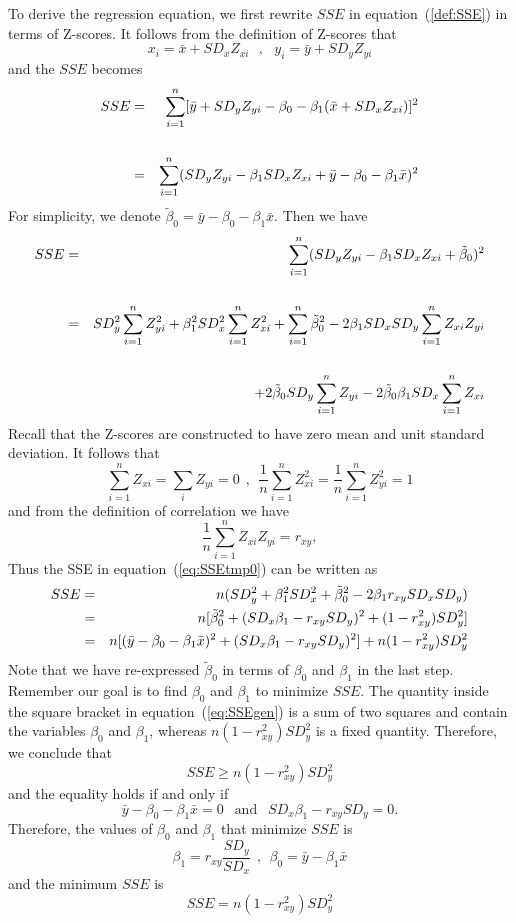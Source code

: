 \documentclass[11pt]{article}
\newcommand{\beq}{\begin{equation}}
\newcommand{\eeq}{\end{equation}}
\newcommand{\beqn}{\begin{eqnarray}}
\newcommand{\eeqn}{\end{eqnarray}}
\begin{document}
To derive the regression equation, we first rewrite $SSE$ in equation~(\ref{def:SSE}) 
in terms of Z-scores. It follows from the definition of Z-scores that 
\[
  x_i = \bar{x} + SD_x Z_{xi} \ \ \ , \ \ \ y_i = \bar{y} + SD_y Z_{yi} 
\]
and the $SSE$ becomes 
\beqn
  SSE &=& \sum_{i=1}^n [\bar{y} + SD_y Z_{yi} - \beta_0 - \beta_1 (\bar{x} + SD_x Z_{xi}) ]^2 \cr 
\cr
&=& \sum_{i=1}^n (SD_y Z_{yi} - \beta_1 SD_x Z_{xi} + \bar{y}-\beta_0 -\beta_1 \bar{x})^2 \nonumber
\eeqn
For simplicity, we denote $\tilde{\beta}_0 = \bar{y}-\beta_0 -\beta_1 \bar{x}$. Then we have 
\beqn
  SSE &=& \sum_{i=1}^n (SD_y Z_{yi} - \beta_1 SD_x Z_{xi} + \tilde{\beta}_0)^2 \cr \cr 
&=& SD_y^2 \sum_{i=1}^n Z_{yi}^2 + \beta_1^2 SD_x^2 \sum_{i=1}^n Z_{xi}^2 
+ \sum_{i=1}^n \tilde{\beta}_0^2 -2\beta_1 SD_x SD_y \sum_{i=1}^n Z_{xi} Z_{yi} \cr \cr 
&& + 2\tilde{\beta}_0 SD_y \sum_{i=1}^n Z_{yi} 
- 2\tilde{\beta}_0 \beta_1 SD_x \sum_{i=1}^n Z_{xi} 
\label{eq:SSEtmp0}
\eeqn
Recall that the Z-scores are constructed to have zero mean and unit standard deviation. 
It follows that 
\[
  \sum_{i=1}^n Z_{xi}=\sum_i Z_{yi} = 0  \ \ , \ \ \frac{1}{n} \sum_{i=1}^n Z_{xi}^2 
= \frac{1}{n} \sum_{i=1}^n Z_{yi}^2 = 1 
\]
and from the definition of correlation we have 
\[
  \frac{1}{n} \sum_{i=1}^n Z_{xi} Z_{yi} = r_{xy} ,
\]
Thus the SSE in equation~(\ref{eq:SSEtmp0}) can be written as 
\beqn
  SSE &=& n (SD_y^2 + \beta_1^2 SD_x^2 + \tilde{\beta}_0^2 - 2\beta_1 r_{xy} SD_x SD_y) \cr
&=& n [ \tilde{\beta}_0^2 + (SD_x \beta_1 - r_{xy} SD_y)^2 + (1-r_{xy}^2)SD_y^2 ] \cr
&=& n [ (\bar{y}-\beta_0 -\beta_1 \bar{x})^2 + (SD_x \beta_1 - r_{xy} SD_y)^2] + n(1-r_{xy}^2)SD_y^2 
\label{eq:SSEgen}
\eeqn
Note that we have re-expressed $\tilde{\beta}_0$ in terms of $\beta_0$ and $\beta_1$ in 
the last step. Remember our goal is to find $\beta_0$ and $\beta_1$ to minimize 
$SSE$. The quantity inside the square bracket in equation~(\ref{eq:SSEgen}) is 
a sum of two squares and contain the variables $\beta_0$ and $\beta_1$, whereas 
$n(1-r_{xy}^2)SD_y^2$ is a fixed quantity. Therefore, we conclude that 
\[
  SSE \geq n(1-r_{xy}^2)SD_y^2
\]
and the equality holds if and only if 
\[
 \bar{y}-\beta_0 -\beta_1 \bar{x} = 0 \ \ \mbox{ and } \ \ 
  SD_x \beta_1 - r_{xy} SD_y = 0 .
\]
Therefore, the values of $\beta_0$ and $\beta_1$ that minimize $SSE$ is 
\beq
  \boxed{ \beta_1 = r_{xy} \frac{SD_y}{SD_x} \ \ , \ \ \beta_0 = \bar{y}-\beta_1 \bar{x} }
\label{eq:regcoefs0}
\eeq
and the minimum $SSE$ is 
\beq
  \boxed{ SSE = n(1-r_{xy}^2) SD_y^2 }
\label{eq:SSEmin}
\eeq
\end{document}
